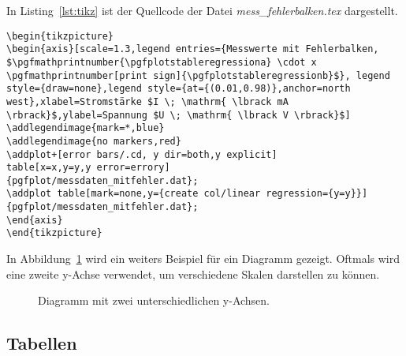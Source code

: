 In Listing~\ref{lst:tikz} ist der Quellcode der Datei \textit{mess\_fehlerbalken.tex} dargestellt.

\begin{lstlisting}[caption=Quellcode der Datei \textit{mess\_fehlerbalken.tex}.,label=lst:tikz]
\begin{tikzpicture}
\begin{axis}[scale=1.3,legend entries={Messwerte mit Fehlerbalken,
$\pgfmathprintnumber{\pgfplotstableregressiona} \cdot x  
\pgfmathprintnumber[print sign]{\pgfplotstableregressionb}$}, legend style={draw=none},legend style={at={(0.01,0.98)},anchor=north west},xlabel=Stromstärke $I \; \mathrm{ \lbrack mA \rbrack}$,ylabel=Spannung $U \; \mathrm{ \lbrack V \rbrack}$]
\addlegendimage{mark=*,blue}
\addlegendimage{no markers,red}
\addplot+[error bars/.cd, y dir=both,y explicit]
table[x=x,y=y,y error=errory] 
{pgfplot/messdaten_mitfehler.dat};
\addplot table[mark=none,y={create col/linear regression={y=y}}]
{pgfplot/messdaten_mitfehler.dat};
\end{axis}
\end{tikzpicture}
\end{lstlisting}

\clearpage

In Abbildung~\ref{fig:pgfplot2y} wird ein weiters Beispiel für ein Diagramm gezeigt. Oftmals wird eine zweite y-Achse verwendet, um verschiedene Skalen darstellen zu können.

\begin{figure}[hbt]
	\centering
	
	\caption[Diagramm mit zwei unterschiedlichen y-Achsen.]{Diagramm mit zwei unterschiedlichen y-Achsen.}
	\label{fig:pgfplot2y}
\end{figure}

\clearpage

\subsection{Tabellen}


